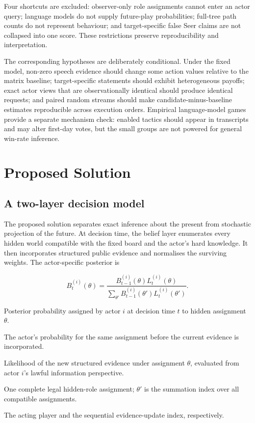 \documentclass[11pt,a4paper]{article}
\begin{document}
Four shortcuts are excluded: observer-only role assignments cannot enter an actor query; language models do not supply future-play probabilities; full-tree path counts do not represent behaviour; and target-specific false Seer claims are not collapsed into one score. These restrictions preserve reproducibility and interpretation.

The corresponding hypotheses are deliberately conditional. Under the fixed model, non-zero speech evidence should change some action values relative to the matrix baseline; target-specific statements should exhibit heterogeneous payoffs; exact actor views that are observationally identical should produce identical requests; and paired random streams should make candidate-minus-baseline estimates reproducible across execution orders. Empirical language-model games provide a separate mechanism check: enabled tactics should appear in transcripts and may alter first-day votes, but the small groups are not powered for general win-rate inference.

\section{Proposed Solution}

\subsection{A two-layer decision model}

The proposed solution separates exact inference about the present from stochastic projection of the future. At decision time, the belief layer enumerates every hidden world compatible with the fixed board and the actor's hard knowledge. It then incorporates structured public evidence and normalises the surviving weights. The actor-specific posterior is

\[
B_t^{(i)}(\theta)=
\frac{B_{t-1}^{(i)}(\theta)L_t^{(i)}(\theta)}
{\sum_{\theta'}B_{t-1}^{(i)}(\theta')L_t^{(i)}(\theta')}.
\]

\begin{description}[style=nextline,leftmargin=3.4cm,labelwidth=3.0cm]
  \item[$B_t^{(i)}(\theta)$] Posterior probability assigned by actor $i$ at decision time $t$ to hidden assignment $\theta$.
  \item[$B_{t-1}^{(i)}(\theta)$] The actor's probability for the same assignment before the current evidence is incorporated.
  \item[$L_t^{(i)}(\theta)$] Likelihood of the new structured evidence under assignment $\theta$, evaluated from actor $i$'s lawful information perspective.
  \item[$\theta$] One complete legal hidden-role assignment; $\theta'$ is the summation index over all compatible assignments.
  \item[$i,t$] The acting player and the sequential evidence-update index, respectively.
\end{description}
\end{document}
